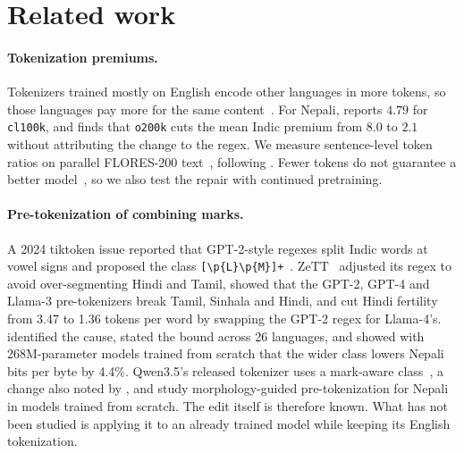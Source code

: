 \section{Related work}
\label{sec:related}

\paragraph{Tokenization premiums.} Tokenizers trained mostly on English encode other languages in more tokens, so those languages pay more for the same content~\citep{rust-etal-2021-good,petrov2023unfairness,ahia-etal-2023-languages,lundin-etal-2026-token}. For Nepali, \citet{kadariya2026nepali} reports $4.79$ for \texttt{cl100k}, and \citet{srivastava2026tokenizertax} finds that \texttt{o200k} cuts the mean Indic premium from $8.0$ to $2.1$ without attributing the change to the regex. We measure sentence-level token ratios on parallel FLORES-200 text~\citep{goyal-etal-2022-flores,nllb2022}, following \citet{petrov2023unfairness}. Fewer tokens do not guarantee a better model~\citep{schmidt-etal-2024-tokenization,zouhar-etal-2023-tokenization}, so we also test the repair with continued pretraining.

\paragraph{Pre-tokenization of combining marks.} A 2024 tiktoken issue reported that GPT-2-style regexes split Indic words at vowel signs and proposed the class \texttt{[\textbackslash p\{L\}\textbackslash p\{M\}]+}~\citep{tiktoken_issue292}. ZeTT~\citep{minixhofer2024zett} adjusted its regex to avoid over-segmenting Hindi and Tamil, \citet{velayuthan-sarveswaran-2025-egalitarian} showed that the GPT-2, GPT-4 and Llama-3 pre-tokenizers break Tamil, Sinhala and Hindi, and \citet{rana2025mutant} cut Hindi fertility from 3.47 to 1.36 tokens per word by swapping the GPT-2 regex for Llama-4's. \citet{regmi2026vowel} identified the cause, stated the bound across 26 languages, and showed with 268M-parameter models trained from scratch that the wider class lowers Nepali bits per byte by 4.4\%. Qwen3.5's released tokenizer uses a mark-aware class~\citep{qwen35tokenizer}, a change also noted by \citet{land2026smallbugs}, and \citet{shrestha2026papaya} study morphology-guided pre-tokenization for Nepali in models trained from scratch. The edit itself is therefore known. What has not been studied is applying it to an already trained model while keeping its English tokenization.

